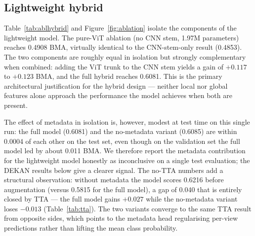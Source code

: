 \subsection{Lightweight hybrid}

Table~\ref{tab:ablhybrid} and Figure~\ref{fig:ablation} isolate the components of
the lightweight model. The pure-ViT ablation (no CNN stem, 1.97M parameters)
reaches 0.4908 BMA, virtually identical to the CNN-stem-only result (0.4853). The
two components are roughly equal in isolation but strongly complementary when
combined: adding the ViT trunk to the CNN stem yields a gain of $+0.117$ to
$+0.123$ BMA, and the full hybrid reaches 0.6081. This is the primary
architectural justification for the hybrid design --- neither local nor global
features alone approach the performance the model achieves when both are present.

The effect of metadata in isolation is, however, modest at test time on this
single run: the full model (0.6081) and the no-metadata variant (0.6085) are
within 0.0004 of each other on the test set, even though on the validation set
the full model led by about 0.011 BMA. We therefore report the metadata
contribution for the lightweight model honestly as inconclusive on a single test
evaluation; the DEKAN results below give a clearer signal. The no-TTA numbers add
a structural observation: without metadata the model scores 0.6216 before
augmentation (versus 0.5815 for the full model), a gap of 0.040 that is entirely
closed by TTA --- the full model gains $+0.027$ while the no-metadata variant
loses $-0.013$ (Table~\ref{tab:tta}). The two variants converge to the same TTA
result from opposite sides, which points to the metadata head regularising
per-view predictions rather than lifting the mean class probability.

\begin{table}[H]
\centering
\caption{Lightweight hybrid ablation (TTA BMA). All four variants were trained
and evaluated.}
\label{tab:ablhybrid}
\end{table}

